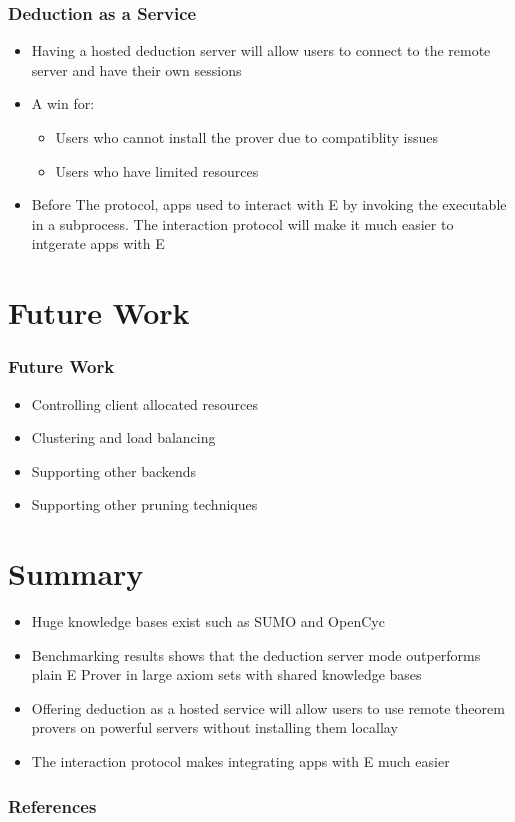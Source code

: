 \documentclass[10pt]{beamer}
\begin{document}
\begin{frame}[fragile]
  \frametitle{Deduction as a Service}
  \begin{itemize}[<+- | alert@+>]
    \item Having a hosted deduction server will allow users to connect to the remote server and have their own sessions
    \item A win for:
      \begin{itemize}
          \item Users who cannot install the prover due to compatiblity issues
          \item Users who have limited resources
      \end{itemize}
    \item Before The protocol, apps used to interact with E by invoking the executable in a subprocess. The interaction protocol will make it much easier to intgerate apps with E
  \end{itemize}

\end{frame}

\section{Future Work}
\begin{frame}[fragile]
  \frametitle{Future Work}
  \begin{itemize}[<+- | alert@+>]
    \item Controlling client allocated resources
    \item Clustering and load balancing
    \item Supporting other backends
    \item Supporting other pruning techniques
  \end{itemize}
\end{frame}

\section{Summary}
\begin{frame}[fragile]
  \begin{itemize}[<+- | alert@+>]
    \item Huge knowledge bases exist such as SUMO and OpenCyc
    \item Benchmarking results shows that the deduction server mode outperforms plain E Prover in large axiom sets with shared knowledge bases
    \item Offering deduction as a hosted service will allow users to use remote theorem provers on powerful servers without installing them locallay
    \item The interaction protocol makes integrating apps with E much easier
  \end{itemize}
\end{frame}


\begin{frame}[allowframebreaks]

  \frametitle{References}

  
  

\end{frame}
\end{document}
